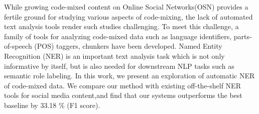 While growing code-mixed content on Online Social Networks(OSN) provides a fertile ground for studying various aspects of code-mixing, the lack of automated text analysis tools render such studies challenging. To meet this challenge, a family of tools for analyzing code-mixed data such as language identifiers, parts-of-speech (POS) taggers, chunkers have been developed. Named Entity Recognition (NER) is an important text analysis task which is not only informative by itself, but is also needed for downstream NLP tasks such as semantic role labeling. In this work, we present an exploration of automatic NER of code-mixed data. We compare our method with existing off-the-shelf NER tools for social media content,and find that our systems outperforms the best baseline by 33.18 \% (F1 score).
